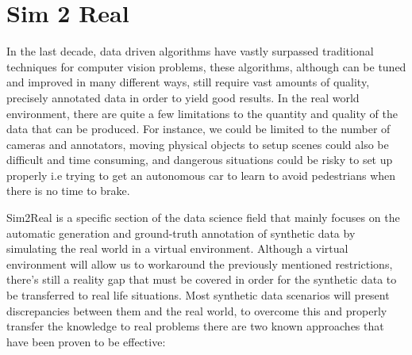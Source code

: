 \section{Sim 2 Real}
\label{sec:sim2real}
In the last decade, data driven algorithms have vastly surpassed traditional techniques for computer vision problems, these algorithms, although can be tuned and improved in many different ways, still require vast amounts of quality, precisely annotated data in order to yield good results. In the real world environment, there are quite a few limitations to the quantity and quality of the data that can be produced. For instance, we could be limited to the number of cameras and annotators, moving physical objects to setup scenes could also be difficult and time consuming, and dangerous situations could be risky to set up properly i.e trying to get an autonomous car to learn to avoid pedestrians when there is no time to brake.
    
Sim2Real is a specific section of the data science field that mainly focuses on the automatic generation and ground-truth annotation of synthetic data by simulating the real world in a virtual environment. Although a virtual environment will allow us to workaround the previously mentioned restrictions, there's still a reality gap that must be covered in order for the synthetic data to be transferred to real life situations. Most synthetic data scenarios will present discrepancies between them and the real world, to overcome this and properly transfer the knowledge to real problems there are two known approaches that have been proven to be effective: 

